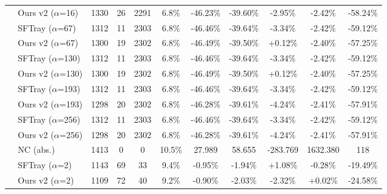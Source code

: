 \begin{table}[t]
{\begin{tabular}{ll|cccc|ccc|cc}
 & Ours v2 ($\alpha$=16) & 1330 & 26 & 2291 & 6.8\% & -46.23\% & -39.60\% & -2.95\% & -2.42\% & -58.24\% \\

\addlinespace[0.3em]

 & SFTray ($\alpha$=67) & 1312 & 11 & 2303 & 6.8\% & -46.46\% & -39.64\% & -3.34\% & -2.42\% & -59.12\% \\

 & Ours v2 ($\alpha$=67) & 1300 & 19 & 2302 & 6.8\% & -46.49\% & -39.50\% & +0.12\% & -2.40\% & -57.25\% \\

\addlinespace[0.3em]

 & SFTray ($\alpha$=130) & 1312 & 11 & 2303 & 6.8\% & -46.46\% & -39.64\% & -3.34\% & -2.42\% & -59.12\% \\

 & Ours v2 ($\alpha$=130) & 1300 & 19 & 2302 & 6.8\% & -46.49\% & -39.50\% & +0.12\% & -2.40\% & -57.25\% \\

\addlinespace[0.3em]

 & SFTray ($\alpha$=193) & 1312 & 11 & 2303 & 6.8\% & -46.46\% & -39.64\% & -3.34\% & -2.42\% & -59.12\% \\

 & Ours v2 ($\alpha$=193) & 1298 & 20 & 2302 & 6.8\% & -46.28\% & -39.61\% & -4.24\% & -2.41\% & -57.91\% \\

\addlinespace[0.3em]

 & SFTray ($\alpha$=256) & 1312 & 11 & 2303 & 6.8\% & -46.46\% & -39.64\% & -3.34\% & -2.42\% & -59.12\% \\

 & Ours v2 ($\alpha$=256) & 1298 & 20 & 2302 & 6.8\% & -46.28\% & -39.61\% & -4.24\% & -2.41\% & -57.91\% \\

\addlinespace[0.3em]

\midrule

\multirow{25}{*}{mock-alu} & NC (abs.) & 1413 & 0 & 0 & 10.5\% & 27.989 & 58.655 & -283.769 & 1632.380 & 118 \\

\addlinespace[0.4em]

 & SFTray ($\alpha$=2) & 1143 & 69 & 33 & 9.4\% & -0.95\% & -1.94\% & +1.08\% & -0.28\% & -19.49\% \\

 & Ours v2 ($\alpha$=2) & 1109 & 72 & 40 & 9.2\% & -0.90\% & -2.03\% & -2.32\% & +0.02\% & -24.58\% \\


\end{tabular}}
\end{table}

